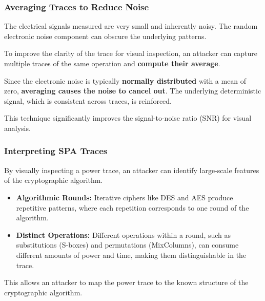 \begin{frame}
    \frametitle{Averaging Traces to Reduce Noise}

    The electrical signals measured are very small and inherently noisy. The random electronic noise component can obscure the underlying patterns.
    
    To improve the clarity of the trace for visual inspection, an attacker can capture multiple traces of the same operation and \textbf{compute their average}.
    
    \begin{alertblock}{}
         Since the electronic noise is typically \textbf{normally distributed} with a mean of zero, \textbf{averaging causes the noise to cancel out}. \newline
         The underlying deterministic signal, which is consistent across traces, is reinforced.
    \end{alertblock}
    
    This technique significantly improves the signal-to-noise ratio (SNR) for visual analysis.
\end{frame}

\begin{frame}
    \frametitle{Interpreting SPA Traces}

    By visually inspecting a power trace, an attacker can identify large-scale features of the cryptographic algorithm.
    
    \begin{itemize}
        \item \textbf{Algorithmic Rounds:} Iterative ciphers like DES and AES produce repetitive patterns, where each repetition corresponds to one round of the algorithm.
        \item \textbf{Distinct Operations:} Different operations within a round, such as substitutions (S-boxes) and permutations (MixColumns), can consume different amounts of power and time, making them distinguishable in the trace.
    \end{itemize}

    This allows an attacker to map the power trace to the known structure of the cryptographic algorithm.
\end{frame}

